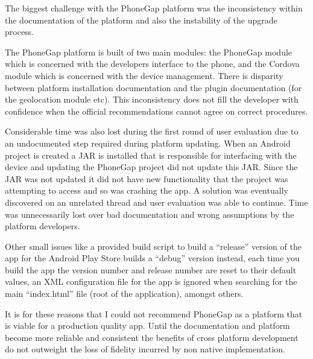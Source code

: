The biggest challenge with the PhoneGap platform was the inconsistency
within the documentation of the platform and also the instability of
the upgrade process. 

The PhoneGap platform is built of two main modules: the PhoneGap
module which is concerned with the developers interface to the phone,
and the Cordova module which is concerned with the device management.
There is disparity between platform installation documentation and the
plugin documentation (for the geolocation module
etc)\cite{phonegap_install, phonegap_cli,
  phonegap_geolocationAccessingFeature}. This inconsistency does not
fill the developer with confidence when the official recommendations
cannot agree on correct procedures. 

Considerable time was also lost during the first round of user
evaluation due to an undocumented step required during platform
updating. When an Android project is created a JAR is installed that
is responsible for interfacing with the device and updating the
PhoneGap project did not update this JAR. Since the JAR was not
updated it did not have new functionality that the project was
attempting to access and so was crashing the app. A solution was
eventually discovered on an unrelated thread\cite{pluginFix} and user
evaluation was able to continue. Time was unnecessarily lost over bad
documentation and wrong assumptions by the platform developers.

Other small issues like a provided build script to build a ``release''
version of the app for the Android Play Store builds a ``debug''
version instead, each time you build the app the version number and
release number are reset to their default values, an XML configuration
file for the app is ignored when searching for the main ``index.html''
file (root of the application), amongst others.

It is for these reasons that I could not recommend PhoneGap as a
platform that is viable for a production quality app. Until the
documentation and platform become more reliable and consistent the
benefits of cross platform development do not outweight the loss of
fidelity incurred by non native implementation.
